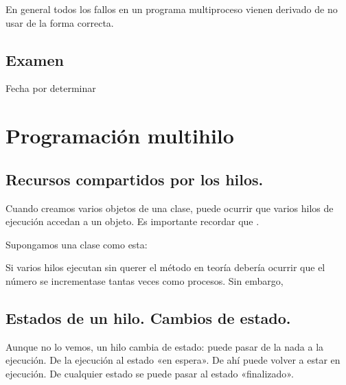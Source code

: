\documentclass[letterpaper,10pt,spanish]{sphinxmanual}
\begin{document}
En general todos los fallos en un programa multiproceso vienen derivado de no usar  de la forma correcta.


\section{Examen}
\label{\detokenize{textos/tema1:examen}}
Fecha por determinar


\chapter{Programación multihilo}
\label{\detokenize{textos/tema2:programacion-multihilo}}\label{\detokenize{textos/tema2::doc}}

\section{Recursos compartidos por los hilos.}
\label{\detokenize{textos/tema2:recursos-compartidos-por-los-hilos}}
Cuando creamos varios objetos de una clase, puede ocurrir que varios hilos de ejecución accedan a un objeto. Es importante recordar que .

Supongamos una clase como esta:

%
\begin{sphinxVerbatim}[commandchars=\\\{\}]
  
         
           
\end{sphinxVerbatim}

Si varios hilos ejecutan sin querer el método  en teoría debería ocurrir que el número se incrementase tantas veces como procesos. Sin embargo, 


\section{Estados de un hilo. Cambios de estado.}
\label{\detokenize{textos/tema2:estados-de-un-hilo-cambios-de-estado}}
Aunque no lo vemos, un hilo cambia de estado: puede pasar de la nada a la ejecución. De la ejecución al estado «en espera». De ahí puede volver a estar en ejecución. De cualquier estado se puede pasar al estado «finalizado».
\end{document}
